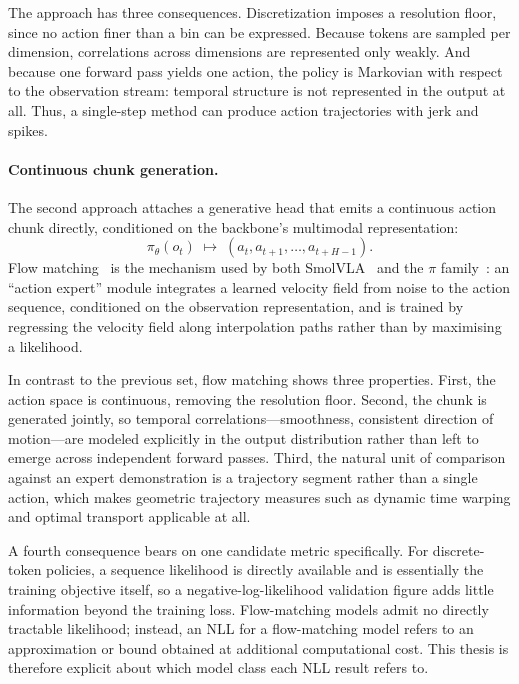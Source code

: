 \documentclass[english,12pt,a4paper,pdftex,elec,utf8]{aaltothesis}
\begin{document}
The approach has three consequences. Discretization imposes a resolution floor, since no action finer than a bin can be expressed. Because tokens are sampled per dimension, correlations across dimensions are represented only weakly. And because one forward pass yields one action, the policy is Markovian with respect to the observation stream: temporal structure is not represented in the output at all. Thus, a single-step method can produce action trajectories with jerk and spikes.

\paragraph{Continuous chunk generation.}
The second approach attaches a generative head that emits a continuous action chunk directly, conditioned on the backbone's multimodal representation:
\begin{equation}
\pi_\theta(o_t) \;\mapsto\; (a_t, a_{t+1}, \dots, a_{t+H-1}).
\end{equation}
Flow matching~\cite{lipman2023flow} is the mechanism used by both SmolVLA~\cite{shukor2025smolvla} and the $\pi$ family~\cite{black2024pi0, intelligence2025pi05}: an ``action expert'' module integrates a learned velocity field from noise to the action sequence, conditioned on the observation representation, and is trained by regressing the velocity field along interpolation paths rather than by maximising a likelihood.

In contrast to the previous set, flow matching shows three properties. First, the action space is continuous, removing the resolution floor. Second, the chunk is generated jointly, so temporal correlations---smoothness, consistent direction of motion---are modeled explicitly in the output distribution rather than left to emerge across independent forward passes. Third, the natural unit of comparison against an expert demonstration is a trajectory segment rather than a single action, which makes geometric trajectory measures such as dynamic time warping and optimal transport applicable at all.

A fourth consequence bears on one candidate metric specifically. For discrete-token policies, a sequence likelihood is directly available and is essentially the training objective itself, so a negative-log-likelihood validation figure adds little information beyond the training loss. Flow-matching models admit no directly tractable likelihood; instead, an NLL for a flow-matching model refers to an approximation or bound obtained at additional computational cost. This thesis is therefore explicit about which model class each NLL result refers to.
\end{document}
